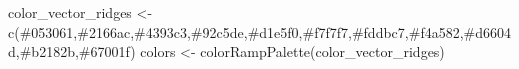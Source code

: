 \documentclass[
  letterpaper,
  DIV=11,
  numbers=noendperiod]{scrreprt}
\newenvironment{Shaded}{\begin{snugshade}}{\end{snugshade}}
\newcommand{\FunctionTok}[1]{\textcolor[rgb]{0.28,0.35,0.67}{#1}}
\newcommand{\NormalTok}[1]{\textcolor[rgb]{0.00,0.23,0.31}{#1}}
\newcommand{\OtherTok}[1]{\textcolor[rgb]{0.00,0.23,0.31}{#1}}
\newcommand{\StringTok}[1]{\textcolor[rgb]{0.13,0.47,0.30}{#1}}
\begin{document}
\begin{Shaded}
\begin{Highlighting}[]
\NormalTok{color\_vector\_ridges }\OtherTok{\textless{}{-}} \FunctionTok{c}\NormalTok{(}\StringTok{\textquotesingle{}\#053061\textquotesingle{}}\NormalTok{,}\StringTok{\textquotesingle{}\#2166ac\textquotesingle{}}\NormalTok{,}\StringTok{\textquotesingle{}\#4393c3\textquotesingle{}}\NormalTok{,}\StringTok{\textquotesingle{}\#92c5de\textquotesingle{}}\NormalTok{,}\StringTok{\textquotesingle{}\#d1e5f0\textquotesingle{}}\NormalTok{,}\StringTok{\textquotesingle{}\#f7f7f7\textquotesingle{}}\NormalTok{,}\StringTok{\textquotesingle{}\#fddbc7\textquotesingle{}}\NormalTok{,}\StringTok{\textquotesingle{}\#f4a582\textquotesingle{}}\NormalTok{,}\StringTok{\textquotesingle{}\#d6604d\textquotesingle{}}\NormalTok{,}\StringTok{\textquotesingle{}\#b2182b\textquotesingle{}}\NormalTok{,}\StringTok{\textquotesingle{}\#67001f\textquotesingle{}}\NormalTok{)}
\NormalTok{colors }\OtherTok{\textless{}{-}} \FunctionTok{colorRampPalette}\NormalTok{(color\_vector\_ridges)}


\end{Highlighting}
\end{Shaded}
\end{document}
